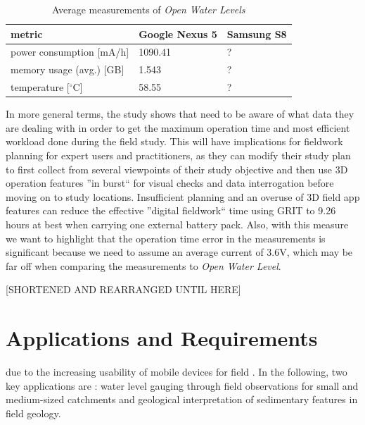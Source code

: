 \documentclass[review]{elsarticle}
\begin{document}
\begin{center}
\begin{longtable}[HT]{| l | p{2.5cm} | p{2.5cm} |}
	\caption{Average measurements of \textit{Open Water Levels}}
	\label{table:power:OWL}
	\endhead
		\hline
		metric & Google Nexus 5 & Samsung S8 \\ \hline
		power consumption [mA/h] & 1090.41 & ? \\ \hline
		memory usage (avg.) [GB] & 1.543 & ? \\ \hline
		temperature [$^{\circ}$C] & 58.55 & ? \\ \hline
\end{longtable}
\end{center}

In more general terms, the study shows that  need to be aware of what data they are dealing with in order to get the maximum operation time and most efficient workload done during the field study. This will have implications for fieldwork planning for expert users and practitioners, as they can modify their study plan to first collect  from several viewpoints of their study objective and then use 3D operation features ''in burst`` for visual checks and data interrogation before moving on to  study locations. Insufficient planning and an overuse of 3D field app features can reduce the effective ''digital fieldwork`` time using \gls{GRIT} to 9.26 hours at best when carrying one external battery pack. Also, with this measure we want to highlight that the operation time error in the measurements is significant because we need to assume an average current of 3.6V, which may be far off when comparing the measurements to \textit{Open Water Level}.

[SHORTENED AND REARRANGED UNTIL HERE]

\section{Applications and Requirements}
\label{sec:applications}
 due to the increasing usability of mobile devices for field . In the following, two key applications are : water level gauging through field observations for small and medium-sized catchments and geological interpretation of sedimentary features in field geology.
\end{document}
